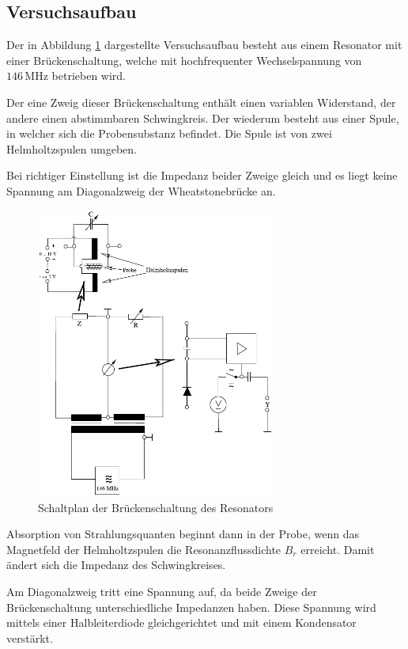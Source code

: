 \documentclass[12pt,a4paper]{scrartcl}
\numberwithin{equation}{section} %
\begin{document}
\hypertarget{Versuchsaufbau}{\subsection{Versuchsaufbau}\label{Versuchsaufbau}}
Der in Abbildung \ref{fig:aufbau} dargestellte Versuchsaufbau besteht aus einem Resonator mit einer Brückenschaltung, welche mit hochfrequenter Wechselspannung von $146 \mathrm{\, MHz}$ betrieben wird.

Der eine Zweig dieser Brückenschaltung enthält einen variablen Widerstand, der andere einen abstimmbaren Schwingkreis. Der wiederum besteht aus einer Spule, in welcher sich die Probensubstanz befindet. Die Spule ist von zwei Helmholtzspulen umgeben.

Bei richtiger Einstellung ist die Impedanz beider Zweige gleich und es liegt keine Spannung am Diagonalzweig der Wheatstonebrücke an.

\begin{figure}[h!]
	\centering
	\includegraphics[width=0.7\textwidth]{../media/B1.5/Aufbau.pdf}
	\caption{Schaltplan der Brückenschaltung des Resonators \cite{Uni}}
	\label{fig:aufbau}
\end{figure}

Absorption von Strahlungsquanten beginnt dann in der Probe, wenn das Magnetfeld der Helmholtzspulen die Resonanzflussdichte $B_r$ erreicht. Damit ändert sich die Impedanz des Schwingkreises.

Am Diagonalzweig tritt eine Spannung auf, da beide Zweige der Brückenschaltung unterschiedliche Impedanzen haben. Diese Spannung wird mittels einer Halbleiterdiode gleichgerichtet und mit einem Kondensator verstärkt.
\end{document}
